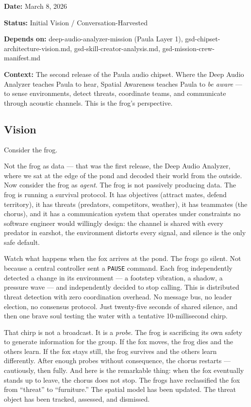 \documentclass[11pt,letterpaper]{article}
\newcommand{\metafield}[2]{\textbf{\sffamily #1} #2\par}
\begin{document}
\metafield{Date:}{March 8, 2026}
\metafield{Status:}{Initial Vision / Conversation-Harvested}
\metafield{Depends on:}{deep-audio-analyzer-mission (Paula Layer 1), gsd-chipset-architecture-vision.md, gsd-skill-creator-analysis.md, gsd-mission-crew-manifest.md}
\metafield{Context:}{The second release of the Paula audio chipset. Where the Deep Audio Analyzer teaches Paula to hear, Spatial Awareness teaches Paula to \textit{be aware} --- to sense environments, detect threats, coordinate teams, and communicate through acoustic channels. This is the frog's perspective.}

\subsection{Vision}

Consider the frog.

Not the frog as data --- that was the first release, the Deep Audio Analyzer, where we sat at the edge of the pond and decoded their world from the outside. Now consider the frog as \textit{agent}. The frog is not passively producing data. The frog is running a survival protocol. It has objectives (attract mates, defend territory), it has threats (predators, competitors, weather), it has teammates (the chorus), and it has a communication system that operates under constraints no software engineer would willingly design: the channel is shared with every predator in earshot, the environment distorts every signal, and silence is the only safe default.

Watch what happens when the fox arrives at the pond. The frogs go silent. Not because a central controller sent a \texttt{PAUSE} command. Each frog independently detected a change in its environment --- a footstep vibration, a shadow, a pressure wave --- and independently decided to stop calling. This is distributed threat detection with zero coordination overhead. No message bus, no leader election, no consensus protocol. Just twenty-five seconds of shared silence, and then one brave soul testing the water with a tentative 10-millisecond chirp.

That chirp is not a broadcast. It is a \textit{probe}. The frog is sacrificing its own safety to generate information for the group. If the fox moves, the frog dies and the others learn. If the fox stays still, the frog survives and the others learn differently. After enough probes without consequence, the chorus restarts --- cautiously, then fully. And here is the remarkable thing: when the fox eventually stands up to leave, the chorus does not stop. The frogs have reclassified the fox from ``threat'' to ``furniture.'' The spatial model has been updated. The threat object has been tracked, assessed, and dismissed.
\end{document}
